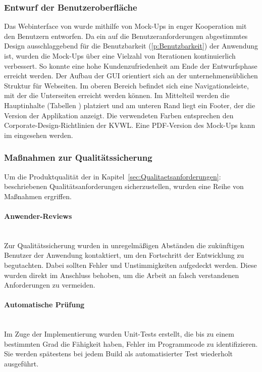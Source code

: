 \subsubsection{Entwurf der Benutzeroberfläche}\label{sec:Benutzeroberflaeche}
Das Webinterface von \projektName wurde mithilfe von Mock-Ups in enger Kooperation mit den Benutzern entworfen. Da ein auf die Benutzeranforderungen abgestimmtes Design ausschlaggebend für die Benutzbarkeit (\ref{p:Benutzbarkeit}) der Anwendung ist, wurden die Mock-Ups über eine Vielzahl von Iterationen kontinuierlich verbessert. So konnte eine hohe Kundenzufriedenheit am Ende der Entwurfsphase erreicht werden. Der Aufbau der \ac{GUI} orientiert sich an der unternehmensüblichen Struktur für Webseiten. Im oberen Bereich befindet sich eine Navigationsleiste, mit der die Unterseiten erreicht werden können. Im Mittelteil werden die Hauptinhalte (Tabellen \etc) platziert und am unteren Rand liegt ein Footer, der die Version der Applikation anzeigt. Die verwendeten Farben entsprechen den Corporate-Design-Richtlinien der \ac{KVWL}. Eine PDF-Version des Mock-Ups kann im  eingesehen werden.

\subsubsection{Maßnahmen zur Qualitätssicherung}\label{sec:Qualitaetssicherung}
Um die Produktqualität der in Kapitel~\ref{sec:Qualitaetsanforderungen}:  beschriebenen Qualitätsanforderungen sicherzustellen, wurden eine Reihe von Maßnahmen ergriffen.

\paragraph{Anwender-Reviews} ~\\\label{p:Reviews}
Zur Qualitätssicherung wurden in unregelmäßigen Abständen die zukünftigen Benutzer der Anwendung kontaktiert, um den Fortschritt der Entwicklung zu begutachten. Dabei sollten Fehler und Unstimmigkeiten aufgedeckt werden. Diese wurden direkt im Anschluss behoben, um \zB die Arbeit an falsch verstandenen Anforderungen zu vermeiden.

\paragraph{Automatische Prüfung} ~\\\label{p:Pruefung}
Im Zuge der Implementierung wurden Unit-Tests erstellt, die bis zu einem bestimmten Grad die Fähigkeit haben, Fehler im Programmcode zu identifizieren. Sie werden spätestens bei jedem Build als automatisierter Test wiederholt ausgeführt.


